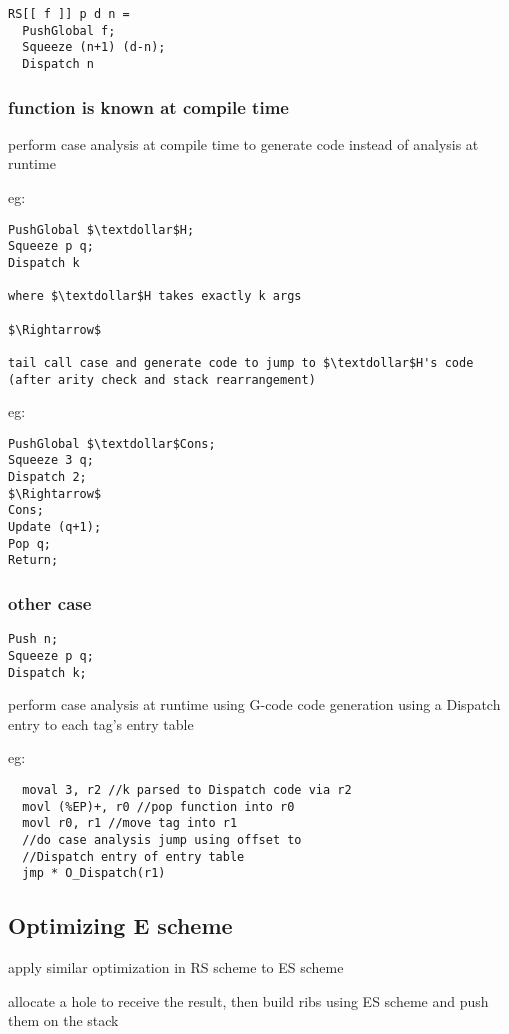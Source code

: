 \documentclass[8pt]{extarticle}
\begin{document}
\begin{multicols*}{2}
\begin{lstlisting}
RS[[ f ]] p d n =
  PushGlobal f;
  Squeeze (n+1) (d-n);
  Dispatch n
\end{lstlisting}

\subsubsection{function is known at compile time}
perform case analysis at compile time to generate code instead of analysis at runtime

eg:

\begin{lstlisting}
PushGlobal $\textdollar$H;
Squeeze p q;
Dispatch k

where $\textdollar$H takes exactly k args

$\Rightarrow$

tail call case and generate code to jump to $\textdollar$H's code
(after arity check and stack rearrangement)
\end{lstlisting}


eg:
\begin{lstlisting}
PushGlobal $\textdollar$Cons;
Squeeze 3 q;
Dispatch 2;
$\Rightarrow$
Cons;
Update (q+1);
Pop q;
Return;
\end{lstlisting}

\subsubsection{other case}

\begin{lstlisting}
Push n;
Squeeze p q;
Dispatch k;
\end{lstlisting}

perform case analysis at runtime using G-code code generation using a Dispatch entry to each tag's entry table

eg:
\begin{lstlisting}
  moval 3, r2 //k parsed to Dispatch code via r2
  movl (%EP)+, r0 //pop function into r0
  movl r0, r1 //move tag into r1
  //do case analysis jump using offset to
  //Dispatch entry of entry table
  jmp * O_Dispatch(r1) 
\end{lstlisting}

\subsection{Optimizing E scheme}

apply similar optimization in RS scheme to ES scheme

allocate a hole to receive the result, then build ribs using ES scheme and push them on the stack


\end{multicols*}
\end{document}
